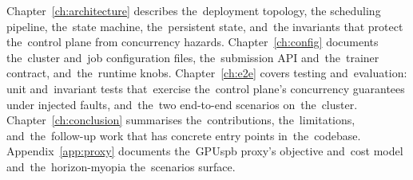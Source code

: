 Chapter~\ref{ch:architecture} describes the~deployment topology, the
scheduling pipeline, the~state machine, the~persistent state, and~the
invariants that protect the~control plane from concurrency hazards.
Chapter~\ref{ch:config} documents the~cluster and~job configuration
files, the~submission API and~the~trainer contract, and~the~runtime knobs.
Chapter~\ref{ch:e2e} covers testing and~evaluation: unit and~invariant tests
that~exercise the~control plane's concurrency guarantees under injected faults,
and~the~two end-to-end scenarios on~the~cluster.
Chapter~\ref{ch:conclusion} summarises the~contributions, the~limitations,
and~the~follow-up work that has concrete entry points in~the~codebase.
Appendix~\ref{app:proxy} documents the~GPUspb proxy's objective and~cost model
and~the~horizon-myopia the~scenarios surface.
